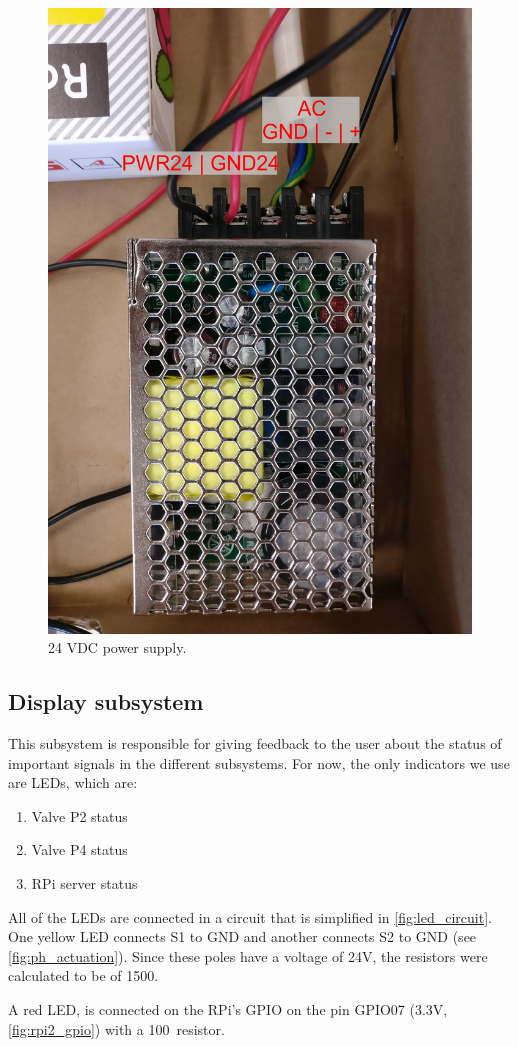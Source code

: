 \documentclass[twoside,a4paper]{refart}
\begin{document}
\begin{figure}[H]
	\centering
	\includegraphics[width=0.7\linewidth]{ph_power24}
	\caption{24 VDC power supply.}
	\label{fig:ph_power24}
\end{figure}

\subsection{Display subsystem}
This subsystem is responsible for giving feedback to the user about the status of important signals in the different subsystems. For now, the only indicators we use are LEDs, which are:
\begin{enumerate}
	\item Valve P2 status
	\item Valve P4 status
	\item RPi server status
\end{enumerate}
All of the LEDs are connected in a circuit that is simplified in \cref{fig:led_circuit}. One yellow LED connects S1 to GND and another connects S2 to GND (see \cref{fig:ph_actuation}). Since these poles have a voltage of 24V, the resistors were calculated to be of 1500\Omega.

A red LED, is connected on the RPi's GPIO on the pin GPIO07 (3.3V, \cref{fig:rpi2_gpio}) with a 100\Omega\ resistor.
\end{document}
